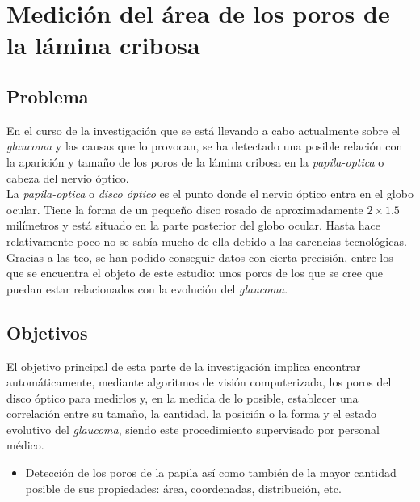 \chapter{Medición del área de los poros de la lámina cribosa}
\section{Problema}
En el curso de la investigación que se está llevando a cabo
actualmente sobre el \emph{\gls{glaucoma}} y las causas que lo
provocan, se ha detectado una posible relación con la aparición y
tamaño de los poros de la lámina cribosa en la
\emph{\gls{papila-optica}} o cabeza del nervio óptico. \\
La \emph{\gls{papila-optica}} o \emph{disco óptico} es el punto donde
el nervio óptico entra en el globo ocular. Tiene la forma de un
pequeño disco rosado de aproximadamente $2 \times 1.5$ milímetros y
está situado en la parte posterior del globo ocular. Hasta hace
relativamente poco no se sabía mucho de ella debido a las carencias
tecnológicas. Gracias a las \gls{tco}, se han podido conseguir datos
con cierta precisión, entre los que se encuentra el objeto de este
estudio: unos poros de los que se cree que puedan estar
relacionados con la evolución del \emph{\gls{glaucoma}}.\\

\section{Objetivos}
El objetivo principal de esta parte de la investigación implica
encontrar automáticamente, mediante algoritmos de visión
computerizada, los poros del disco óptico para medirlos y, en la
medida de lo posible, establecer una correlación entre su tamaño, la
cantidad, la posición o la forma y el estado evolutivo del
\emph{\gls{glaucoma}}, siendo este procedimiento supervisado por
personal médico.
\begin{itemize}
\item Detección de los poros de la papila así como también de la mayor
  cantidad posible de sus propiedades: área, coordenadas,
  distribución, etc.
\end{itemize}

